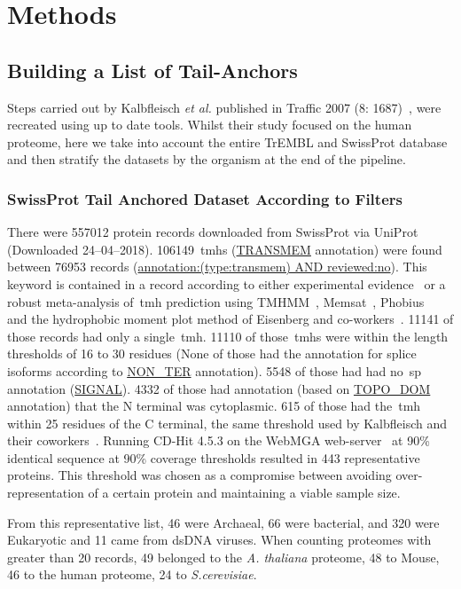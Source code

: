 \section{Methods}

\subsection{Building a List of Tail-Anchors}
Steps carried out by Kalbfleisch \textit{et al.} published in Traffic 2007 (8: 1687)~\cite{Kalbfleisch2007}, were recreated using up to date tools.
Whilst their study focused on the human proteome, here we take into account the entire TrEMBL and SwissProt database and then stratify the datasets by the organism at the end of the pipeline.

\subsubsection{SwissProt Tail Anchored Dataset According to Filters}
There were 557012 protein records downloaded from SwissProt via UniProt~\cite{TheUniProtConsortium2014} (Downloaded 24--04--2018).
106149~\gls{tmh}s (\url{TRANSMEM} annotation) were found between 76953 records (\url{annotation:(type:transmem) AND reviewed:no}).
This keyword is contained in a record according to either experimental evidence~\cite{TheUniProtConsortium2014} or a robust meta-analysis of~\gls{tmh} prediction using TMHMM~\cite{Krogh2001}, Memsat~\cite{Jones2007}, Phobius~\cite{Kall2004,Kall2007} and the hydrophobic moment plot method of Eisenberg and co-workers~\cite{Eisenberg1984}.
11141 of those records had only a single~\gls{tmh}.
11110 of those~\gls{tmh}s were within the length thresholds of 16 to 30 residues (None of those had the annotation for splice isoforms according to \url{NON_TER} annotation).
5548 of those had had no~\gls{sp} annotation (\url{SIGNAL}).
4332 of those had annotation (based on \url{TOPO_DOM} annotation) that the N terminal was cytoplasmic.
615 of those had the~\gls{tmh} within 25 residues of the C terminal, the same threshold used by Kalbfleisch and their coworkers~\cite{Kalbfleisch2007}.
Running CD-Hit 4.5.3 on the WebMGA web-server~\cite{Huang2010, Wu2011} at 90\% identical sequence at 90\% coverage thresholds resulted in 443 representative proteins.
This threshold was chosen as a compromise between avoiding over-representation of a certain protein and maintaining a viable sample size.

From this representative list, 46 were Archaeal, 66 were bacterial, and 320 were Eukaryotic and 11 came from dsDNA viruses.
When counting proteomes with greater than 20 records, 49 belonged to the \textit{A. thaliana} proteome, 48 to Mouse, 46 to the human proteome, 24 to \textit{S.cerevisiae}. %

